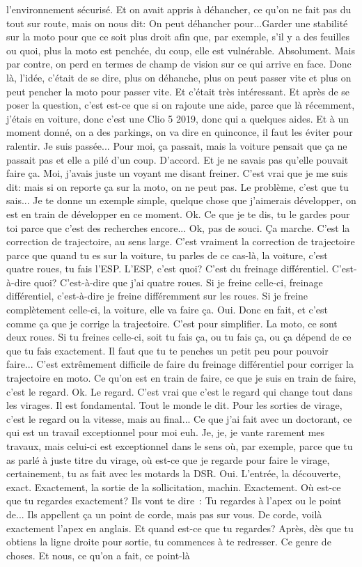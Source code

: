 l'environnement sécurisé. Et on avait appris à déhancher, ce qu'on ne fait pas du tout sur route, mais on nous dit: On peut déhancher pour...Garder une stabilité sur la moto pour que ce soit plus droit afin que, par exemple, s'il y a des feuilles ou quoi, plus la moto est penchée, du coup, elle est vulnérable. Absolument. Mais par contre, on perd en termes de champ de vision sur ce qui arrive en face. Donc là, l'idée, c'était de se dire, plus on déhanche, plus on peut passer vite et plus on peut pencher la moto pour passer vite. Et c'était très intéressant. Et après de se poser la question, c'est est-ce que si on rajoute une aide, parce que là récemment, j'étais en voiture, donc c'est une Clio 5 2019, donc qui a quelques aides. Et à un moment donné, on a des parkings, on va dire en quinconce, il faut les éviter pour ralentir. Je suis passée... Pour moi, ça passait, mais la voiture pensait que ça ne passait pas et elle a pilé d'un coup. D'accord. Et je ne savais pas qu'elle pouvait faire ça. Moi, j'avais juste un voyant me disant freiner. C'est vrai que je me suis dit: mais si on reporte ça sur la moto, on ne peut pas. Le problème, c'est que tu sais... Je te donne un exemple simple, quelque chose que j'aimerais développer, on est en train de développer en ce moment. Ok. Ce que je te dis, tu le gardes pour toi parce que c'est des recherches encore... Ok, pas de souci. Ça marche. C'est la correction de trajectoire, au sens large. C'est vraiment la correction de trajectoire parce que quand tu es sur la voiture, tu parles de ce cas-là, la voiture, c'est quatre roues, tu fais l'ESP. L'ESP, c'est quoi? C'est du freinage différentiel. C'est-à-dire quoi? C'est-à-dire que j'ai quatre roues. Si je freine celle-ci, freinage différentiel, c'est-à-dire je freine différemment sur les roues. Si je freine complètement celle-ci, la voiture, elle va faire ça. Oui. Donc en fait, et c'est comme ça que je corrige la trajectoire. C'est pour simplifier. La moto, ce sont deux roues. Si tu freines celle-ci, soit tu fais ça, ou tu fais ça, ou ça dépend de ce que tu fais exactement. Il faut que tu te penches un petit peu pour pouvoir faire... C'est extrêmement difficile de faire du freinage différentiel pour corriger la trajectoire en moto. Ce qu'on est en train de faire, ce que je suis en train de faire, c'est le regard. Ok. Le regard. C'est vrai que c'est le regard qui change tout dans les virages. Il est fondamental. Tout le monde le dit. Pour les sorties de virage, c'est le regard ou la vitesse, mais au final... Ce que j'ai fait avec un doctorant, ce qui est un travail exceptionnel pour moi euh. Je, je, je vante rarement mes travaux, mais celui-ci est exceptionnel dans le sens où, par exemple, parce que tu as parlé à juste titre du virage, où est-ce que je regarde pour faire le virage, certainement, tu as fait avec les motards la DSR. Oui. L'entrée, la découverte, exact. Exactement, la sortie de la sollicitation, machin. Exactement. Où est-ce que tu regardes exactement? Ils vont te dire : Tu regardes à l'apex ou le point de... Ils appellent ça un point de corde, mais pas sur vous. De corde, voilà exactement l'apex en anglais. Et quand est-ce que tu regardes? Après, dès que tu obtiens la ligne droite pour sortie, tu commences à te redresser. Ce genre de choses. Et nous, ce qu'on a fait, ce point-là 